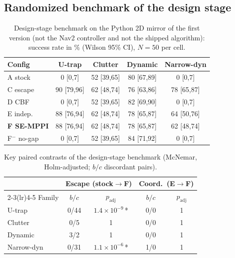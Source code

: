 \documentclass[journal]{IEEEtran}
\begin{document}
\subsection{Randomized benchmark of the design stage}

\begin{table}[t]
\centering
\caption{Design-stage benchmark on the Python 2D mirror of the first version (not the Nav2
controller and not the shipped algorithm): success rate in \% (Wilson 95\% CI), $N=50$ per cell.}
\label{tab:v1-success}
\footnotesize
\setlength{\tabcolsep}{3.5pt}
\begin{tabular}{lcccc}
\toprule
Config & U-trap & Clutter & Dynamic & Narrow-dyn \\
\midrule
A stock            & 0 [0,7]    & 52 [39,65] & 80 [67,89] & 0 [0,7]    \\
C escape           & 90 [79,96] & 62 [48,74] & 76 [63,86] & 78 [65,87] \\
D CBF              & 0 [0,7]    & 52 [39,65] & 82 [69,90] & 0 [0,7]    \\
E indep.           & 88 [76,94] & 62 [48,74] & 78 [65,87] & 64 [50,76] \\
\textbf{F SE-MPPI} & 88 [76,94] & 62 [48,74] & 78 [65,87] & 62 [48,74] \\
F$^{-}$ no-gap     & 0 [0,7]    & 52 [39,65] & 84 [71,92] & 0 [0,7]    \\
\bottomrule
\end{tabular}
\end{table}

\begin{table}[t]
\centering
\caption{Key paired contrasts of the design-stage benchmark (McNemar, Holm-adjusted; $b/c$
discordant pairs).}
\label{tab:v1-stats}
\footnotesize
\setlength{\tabcolsep}{4pt}
\begin{tabular}{lcccc}
\toprule
 & \multicolumn{2}{c}{Escape (stock$\to$F)} & \multicolumn{2}{c}{Coord.\ (E$\to$F)} \\
\cmidrule(lr){2-3}\cmidrule(lr){4-5}
Family & $b/c$ & $p_\text{adj}$ & $b/c$ & $p_\text{adj}$ \\
\midrule
U-trap     & 0/44 & $1.4\!\times\!10^{-9}$\,* & 0/0 & 1 \\
Clutter    & 0/5  & 1                          & 0/0 & 1 \\
Dynamic    & 3/2  & 1                          & 0/0 & 1 \\
Narrow-dyn & 0/31 & $1.1\!\times\!10^{-6}$\,* & 1/0 & 1 \\
\bottomrule
\end{tabular}
\end{table}
\end{document}
